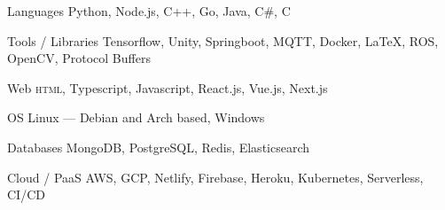 

\begin{cvskills}

  \cvskill
  {Languages} %
  {Python, Node.js, C++, Go, Java, C\#, C} %

  \cvskill
  {Tools / Libraries} %
  {Tensorflow, Unity, Springboot, MQTT, Docker, \LaTeX, ROS, OpenCV, Protocol Buffers} %

  \cvskill
  {Web} %
  {\textsc{html}, Typescript, Javascript, React.js, Vue.js, Next.js} %

  \cvskill
  {OS} %
  {Linux --- Debian and Arch based, Windows} %

  \cvskill
  {Databases} %
  {MongoDB, PostgreSQL, Redis, Elasticsearch} %

  \cvskill
  {Cloud / PaaS} %
  {AWS, GCP, Netlify, Firebase, Heroku, Kubernetes, Serverless, CI/CD} %

\end{cvskills}
